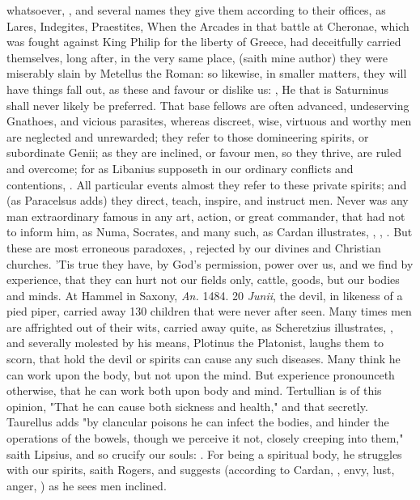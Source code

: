 whatsoever, , \etc{} and
several names they give them according to their offices, as Lares, Indegites,
Praestites, \etc{} When the Arcades in that battle at Cheronae, which was
fought against King Philip for the liberty of Greece, had deceitfully carried
themselves, long after, in the very same place, 
(saith mine author) they were miserably slain by Metellus the Roman: so
likewise, in smaller matters, they will have things fall out, as these
 and  favour or dislike us: , \etc{} He that is Saturninus shall never likely be preferred.
That base fellows are often advanced, undeserving
Gnathoes, and vicious parasites, whereas discreet, wise, virtuous and worthy
men are neglected and unrewarded; they refer to those domineering spirits, or
subordinate Genii; as they are inclined, or favour men, so they thrive, are
ruled and overcome; for as Libanius supposeth in our
ordinary conflicts and contentions, . All particular events almost they
refer to these private spirits; and (as Paracelsus adds) they direct, teach,
inspire, and instruct men. Never was any man extraordinary famous in any art,
action, or great commander, that had not  to inform
him, as Numa, Socrates, and many such, as Cardan illustrates,
, ,
. But these are most
erroneous paradoxes, , rejected by our divines
and Christian churches. 'Tis true they have, by God's permission, power over
us, and we find by experience, that they can hurt not our
fields only, cattle, goods, but our bodies and minds. At Hammel in Saxony,
\emph{An.} 1484. 20 \emph{Junii}, the devil, in likeness of a pied piper,
carried away 130 children that were never after seen. Many times men are
affrighted out of their wits, carried away quite, as
Scheretzius illustrates, , and severally
molested by his means, Plotinus the Platonist,  laughs them to scorn, that hold the devil or spirits can cause
any such diseases. Many think he can work upon the body, but not upon the mind.
But experience pronounceth otherwise, that he can work both upon body and mind.
Tertullian is of this opinion, 
"That he can cause both sickness and health," and that
secretly. Taurellus adds "by clancular poisons he can
infect the bodies, and hinder the operations of the bowels, though we perceive
it not, closely creeping into them," saith Lipsius, and so
crucify our souls: . For being a
spiritual body, he struggles with our spirits, saith Rogers, and suggests
(according to Cardan, , envy, lust, anger, \etc{}) as he sees men inclined.

